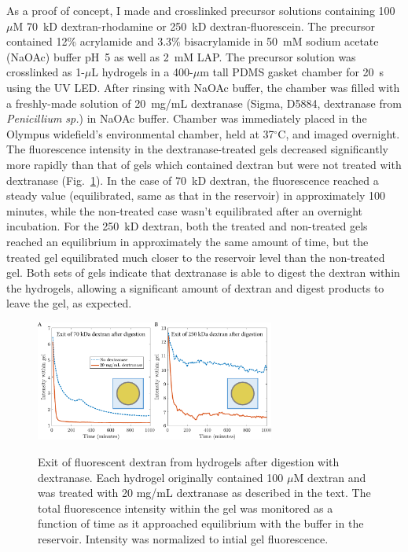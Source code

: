 As a proof of concept, I made and crosslinked precursor solutions containing 100~$\mu$M 70~kD dextran-rhodamine or 250~kD dextran-fluorescein.  The precursor contained 12\% acrylamide and 3.3\% bisacrylamide in 50~mM sodium acetate (NaOAc) buffer pH~5 as well as 2~mM LAP.  The precursor solution was crosslinked as 1-$\mu$L hydrogels in a 400-$\mu$m tall PDMS gasket chamber for 20~s using the UV LED.  After rinsing with NaOAc buffer, the chamber was filled with a freshly-made solution of 20~mg/mL dextranase (Sigma, D5884, dextranase from \textit{Penicillium sp.}) in NaOAc buffer.  Chamber was immediately placed in the Olympus widefield's environmental chamber, held at 37$^\circ$C, and imaged overnight. The fluorescence intensity in the dextranase-treated gels decreased significantly more rapidly than that of gels which contained dextran but were not treated with dextranase (Fig.~\ref{fig:dxase-equilibration}).  In the case of 70~kD dextran, the fluorescence reached a steady value (equilibrated, same as that in the reservoir) in approximately 100 minutes, while the non-treated case wasn't equilibrated after an overnight incubation.  For the 250~kD dextran, both the treated and non-treated gels reached an equilibrium in approximately the same amount of time, but the treated gel equilibrated much closer to the reservoir level than the non-treated gel.  Both sets of gels indicate that dextranase is able to digest the dextran within the hydrogels, allowing a significant amount of dextran and digest products to leave the gel, as expected.
\begin{figure}
\caption[Equilibration of hydrogels after digestion of dextran porogen.]{Exit of fluorescent dextran from hydrogels after digestion with dextranase.  Each hydrogel originally contained 100 $\mu$M dextran and was treated with 20 mg/mL dextranase as described in the text.  The total fluorescence intensity within the gel was monitored as a function of time as it approached equilibrium with the buffer in the reservoir.  Intensity was normalized to intial gel fluorescence.}
\centering
\includegraphics[width=0.7\textwidth]{figs/ch03/dxase-equilibration}
\label{fig:dxase-equilibration}
\end{figure}

